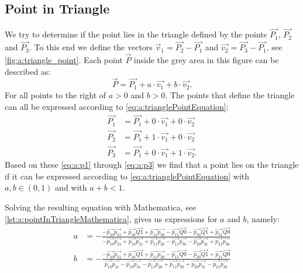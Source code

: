 \subsection*{Point in Triangle}

We try to determine if the point  lies in the triangle defined by the points $\vec{P_1}$, $\vec{P_2}$ and $\vec{P_3}$. To this end we define the vectors $\vec{v}_1 = \vec{P_2} - \vec{P_1}$ and $\vec{v_2} = \vec{P_3} - \vec{P_1}$, see \autoref{fig:a:triangle_point}. Each point $\vec{P}$ inside the grey area in this figure can be described as:
\begin{equation} \label{eq:a:trianglePointEquation}
	\vec{P} = \vec{P_1} + a \cdot \vec{v_1} + b \cdot \vec{v_2}.
\end{equation}
For all points to the right of  $a > 0$ and $b > 0$. The points that define the triangle can all be expressed according to \eqref{eq:a:trianglePointEquation}:
\begin{align}
	\vec{P_1} &= \vec{P_1} + 0 \cdot \vec{v_1} + 0 \cdot \vec{v_2} \label{eq:a:p1}\\ 
	\vec{P_2} &= \vec{P_1} + 1 \cdot \vec{v_1} + 0 \cdot \vec{v_2} \label{eq:a:p2}\\ 
	\vec{P_3} &= \vec{P_1} + 0 \cdot \vec{v_1} + 1 \cdot \vec{v_2} \label{eq:a:p3}.
\end{align}
Based on these \eqref{eq:a:p1} through \eqref{eq:a:p3} we find that a point  lies on the triangle if it can be expressed according to \eqref{eq:a:trianglePointEquation} with $a,b \in (0,1)$ and with $a + b < 1$. 

Solving the resulting equation with Mathematica, see \autoref{lst:a:pointInTriangleMathematica}, gives us expressions for $a$ and $b$, namely:
	\begin{align}
	a &= -\frac{-\vec{p_{10}} \vec{p_{31}}+\vec{p_{10}} \vec{Q1}+\vec{p_{11}} \vec{p_{30}}-\vec{p_{11}}
   \vec{Q0}-\vec{p_{30}} \vec{Q1}+\vec{p_{31}} \vec{Q0}}{-\vec{p_{10}}
   \vec{p_{21}}+\vec{p_{10}} \vec{p_{31}}+\vec{p_{11}} \vec{p_{20}}-\vec{p_{11}}
   \vec{p_{30}}-\vec{p_{20}} \vec{p_{31}}+\vec{p_{21}} \vec{p_{30}}}\\
	b &= -\frac{-\vec{p_{10}} \vec{p_{21}}+\vec{p_{10}} \vec{Q1}+\vec{p_{11}} \vec{p_{20}}-\vec{p_{11}}
   \vec{Q0}-\vec{p_{20}} \vec{Q1}+\vec{p_{21}} \vec{Q0}}{\vec{p_{10}}
   \vec{p_{21}}-\vec{p_{10}} \vec{p_{31}}-\vec{p_{11}} \vec{p_{20}}+\vec{p_{11}}
   \vec{p_{30}}+\vec{p_{20}} \vec{p_{31}}-\vec{p_{21}} \vec{p_{30}}}
	\end{align}

